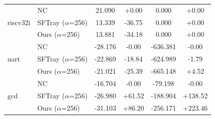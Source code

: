 \begin{table}[t]
{\begin{tabular}{llcccc}
\multirow{3}{*}{riscv32i} & NC & 21.090 & +0.00 & 0.000 & +0.00 \\
 & SFTray  ($\alpha$=256) & 13.339 & -36.75 & 0.000 & +0.00 \\
 & Ours  ($\alpha$=256) & 13.881 & -34.18 & 0.000 & +0.00 \\
\midrule
\multirow{3}{*}{uart} & NC & -28.176 & -0.00 & -636.381 & -0.00 \\
 & SFTray  ($\alpha$=256) & -22.869 & -18.84 & -624.989 & -1.79 \\
 & Ours  ($\alpha$=256) & -21.021 & -25.39 & -665.148 & +4.52 \\
\midrule
\multirow{3}{*}{gcd} & NC & -16.704 & -0.00 & -79.198 & -0.00 \\
 & SFTray  ($\alpha$=256) & -26.980 & +61.52 & -188.904 & +138.52 \\
 & Ours  ($\alpha$=256) & -31.103 & +86.20 & -256.171 & +223.46 \\
\midrule
\bottomrule
\end{tabular}
}
\end{table}